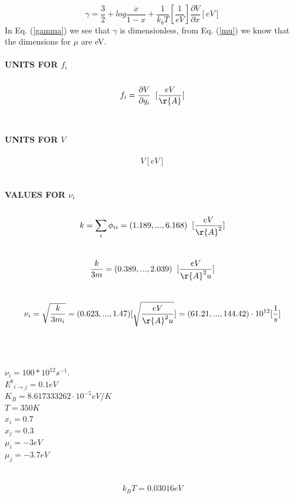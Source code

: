 \documentclass{article}
\begin{document}
\begin{equation} \label{gamma}
    \gamma = \frac{3}{2} + log\frac{x}{1-x}+\frac{1}{k_bT}[\frac{1}{eV}]\frac{\partial V}{\partial x}[eV]
\end{equation}
In Eq. (\ref{gamma}) we see that $\gamma$ is dimensionless, from Eq. (\ref{mu}) we know that the dimensions for $\mu$ are eV.
\\ \\
\textbf{UNITS FOR $f_i$} 
\\ \\
\begin{equation}
    f_i = \frac{\partial V}{\partial q_i} \;\; [\frac{eV}{\r{A}}]
\end{equation}
\\ \\
\textbf{UNITS FOR $V$} 
\\ \\
\begin{equation}
V [eV]
\end{equation}
\\ \\
\textbf{VALUES FOR $\nu_i$} 
\\ \\
\begin{equation}
     k=\sum_i \phi_{ii}=(1.189,...,6.168) \;\; [\frac{eV}{\r{A}^2}]
\end{equation}
\\
\begin{equation}
    \frac{k}{3m}=(0.389,...,2.039)\;\; [\frac{eV}{\r{A}^2u}]
\end{equation}
\\
\begin{equation}
    \nu_i=\sqrt{\frac{k}{3m_i}}=(0.623,...,1.47) [\sqrt{\frac{eV}{\r{A}^2u}}] = (61.21,...,144.42)  \cdot 10^{12} [\frac{1}{s}]
\end{equation}
\\ \\ \\
$\nu_i = 100*10^{12} s^{-1}.$
\\
${E^b}_{i\rightarrow j}=0.1 eV$
\\
$K_B = 8.617333262 \cdot 10^{-5} eV/K$
\\
$T = 350K$
\\
$x_i = 0.7$
\\
$x_j = 0.3$
\\
$\mu_i = -3 eV$
\\
$\mu_j = -3.7 eV$
\\ \\ \\
\begin{equation}\nonumber
k_BT = 0.03016 eV
\end{equation}
\end{document}
